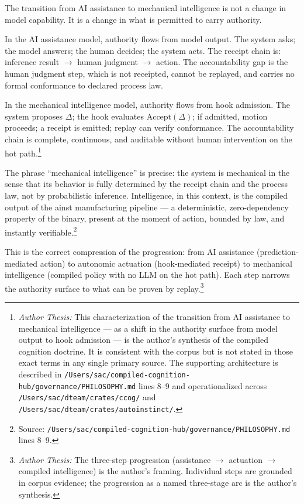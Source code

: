 The transition from AI assistance to mechanical intelligence is not a change in model
capability. It is a change in what is permitted to carry authority.

In the AI assistance model, authority flows from model output. The system asks; the model
answers; the human decides; the system acts. The receipt chain is: inference result
$\to$ human judgment $\to$ action. The accountability gap is the human judgment step, which
is not receipted, cannot be replayed, and carries no formal conformance to declared process
law.

In the mechanical intelligence model, authority flows from hook admission. The system
proposes $\Delta$; the hook evaluates $\text{Accept}(\Delta)$; if admitted, motion proceeds;
a receipt is emitted; replay can verify conformance. The accountability chain is complete,
continuous, and auditable without human intervention on the hot path.\footnote{\textit{Author
Thesis:} This characterization of the transition from AI assistance to mechanical intelligence
--- as a shift in the authority surface from model output to hook admission --- is the
author's synthesis of the compiled cognition doctrine. It is consistent with the corpus but
is not stated in those exact terms in any single primary source. The supporting architecture
is described in \texttt{/Users/sac/compiled-cognition-hub/governance/PHILOSOPHY.md} lines
8--9 and operationalized across \texttt{/Users/sac/dteam/crates/ccog/} and
\texttt{/Users/sac/dteam/crates/autoinstinct/}.}

The phrase ``mechanical intelligence'' is precise: the system is mechanical in the sense
that its behavior is fully determined by the receipt chain and the process law, not by
probabilistic inference. Intelligence, in this context, is the compiled output of the ainst
manufacturing pipeline --- a deterministic, zero-dependency property of the binary, present
at the moment of action, bounded by law, and instantly verifiable.\footnote{Source:
\texttt{/Users/sac/compiled-cognition-hub/governance/PHILOSOPHY.md} lines 8--9.}

This is the correct compression of the progression: from AI assistance (prediction-mediated
action) to autonomic actuation (hook-mediated receipt) to mechanical intelligence (compiled
policy with no LLM on the hot path). Each step narrows the authority surface to what can be
proven by replay.\footnote{\textit{Author Thesis:} The three-step progression (assistance
$\to$ actuation $\to$ compiled intelligence) is the author's framing. Individual steps are
grounded in corpus evidence; the progression as a named three-stage arc is the author's
synthesis.}

